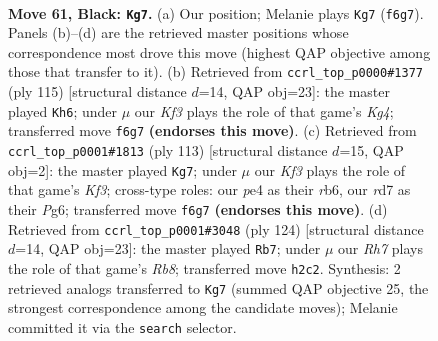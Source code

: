 \documentclass[11pt]{article}
\begin{document}
\clearpage

\begin{figure}[p]\centering
\begin{subfigure}{0.46\textwidth}\centering
\resizebox{\linewidth}{!}{%
\newchessgame
\chessboard[
  setfen={1R6/3R1p2/4pk2/8/P3PK2/5P2/7r/8 b - - 14 61},
  showmover=false,
  pgfstyle=straightmove, color=movearrow, markmove={f6-g7}
]}
\caption{}
\end{subfigure}\hfill
\begin{subfigure}{0.46\textwidth}\centering
\resizebox{\linewidth}{!}{%
\newchessgame
\chessboard[
  setfen={8/r7/3R2p1/6kp/8/6PP/5PK1/8 b - - 16 58},
  showmover=false,
  pgfstyle=straightmove, color=movearrow, markmove={g5-h6}
]}
\caption{}
\end{subfigure}
\\[4pt]
\begin{subfigure}{0.46\textwidth}\centering
\resizebox{\linewidth}{!}{%
\newchessgame
\chessboard[
  setfen={8/8/1R3kp1/7p/r6P/6K1/5PP1/8 b - - 11 57},
  showmover=false,
  pgfstyle=straightmove, color=movearrow, markmove={f6-g7}
]}
\caption{}
\end{subfigure}\hfill
\begin{subfigure}{0.46\textwidth}\centering
\resizebox{\linewidth}{!}{%
\newchessgame
\chessboard[
  setfen={1R6/8/5kp1/4p3/8/4PK2/2r2P2/8 w - - 14 63},
  showmover=false,
  pgfstyle=straightmove, color=movearrow, markmove={b8-b7}
]}
\caption{}
\end{subfigure}
\caption{\textbf{Move 61, Black: \texttt{Kg7}.} (a) Our position; Melanie plays \texttt{Kg7} (\texttt{f6g7}). Panels (b)--(d) are the retrieved master positions whose correspondence most drove this move (highest QAP objective among those that transfer to it). (b) Retrieved from \texttt{ccrl\_top\_p0000\#1377} (ply 115) [structural distance $d$=14, QAP obj=23]: the master played \texttt{Kh6}; under $\mu$ our \emph{Kf3} plays the role of that game's \emph{Kg4}; transferred move \texttt{f6g7} \textbf{(endorses this move)}. (c) Retrieved from \texttt{ccrl\_top\_p0001\#1813} (ply 113) [structural distance $d$=15, QAP obj=2]: the master played \texttt{Kg7}; under $\mu$ our \emph{Kf3} plays the role of that game's \emph{Kf3}; cross-type roles: our \emph{p}e4 as their \emph{r}b6, our \emph{r}d7 as their \emph{P}g6; transferred move \texttt{f6g7} \textbf{(endorses this move)}. (d) Retrieved from \texttt{ccrl\_top\_p0001\#3048} (ply 124) [structural distance $d$=14, QAP obj=23]: the master played \texttt{Rb7}; under $\mu$ our \emph{Rh7} plays the role of that game's \emph{Rb8}; transferred move \texttt{h2c2}. Synthesis: 2 retrieved analogs transferred to \texttt{Kg7} (summed QAP objective 25, the strongest correspondence among the candidate moves); Melanie committed it via the \texttt{search} selector.}
\label{fig:thought-m121}
\end{figure}
\end{document}
